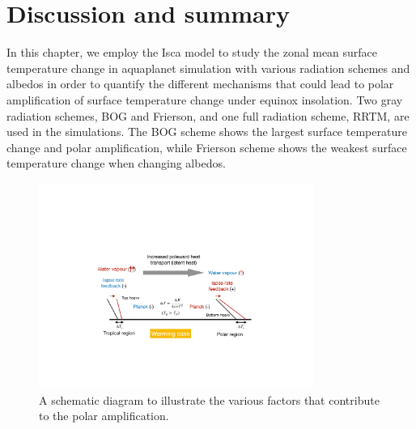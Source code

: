 
\section{Discussion and summary}
\label{sec:polar_amplification_summary}

In this chapter, we employ the Isca model to study the zonal mean surface temperature change in aquaplanet simulation with various radiation schemes and albedos in order to quantify the different mechanisms that could lead to polar amplification of surface temperature change under equinox insolation. Two gray radiation schemes, BOG and Frierson, and one full radiation scheme, RRTM, are used in the simulations. The BOG scheme shows the largest surface temperature change and polar amplification, while Frierson scheme shows the weakest surface temperature change when changing albedos. %

\begin{figure}[ht]
    \centering
	\includegraphics[width=0.8\textwidth]{figs/polar_amp/pa_dynamic.pdf}
	\caption{A schematic diagram to illustrate the various factors that contribute to the polar amplification.}
	\label{fig:pa_mechanism_schematic}
\end{figure}


